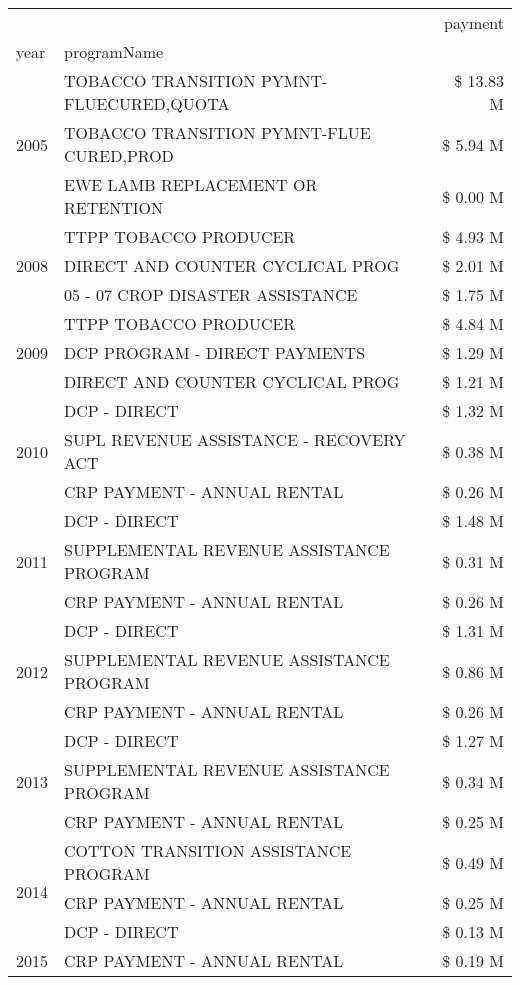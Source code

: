 \begin{tabular}{llr}
\toprule
 &  & payment \\
year & programName &  \\
\midrule
\multirow[t]{3}{*}{2005} & TOBACCO TRANSITION PYMNT-FLUECURED,QUOTA & \$ 13.83 M \\
 & TOBACCO TRANSITION PYMNT-FLUE CURED,PROD & \$ 5.94 M \\
 & EWE LAMB REPLACEMENT OR RETENTION & \$ 0.00 M \\
\cline{1-3}
\multirow[t]{3}{*}{2008} & TTPP TOBACCO PRODUCER & \$ 4.93 M \\
 & DIRECT AND COUNTER CYCLICAL PROG & \$ 2.01 M \\
 & 05 - 07 CROP DISASTER ASSISTANCE & \$ 1.75 M \\
\cline{1-3}
\multirow[t]{3}{*}{2009} & TTPP TOBACCO PRODUCER & \$ 4.84 M \\
 & DCP PROGRAM - DIRECT PAYMENTS & \$ 1.29 M \\
 & DIRECT AND COUNTER CYCLICAL PROG & \$ 1.21 M \\
\cline{1-3}
\multirow[t]{3}{*}{2010} & DCP - DIRECT & \$ 1.32 M \\
 & SUPL REVENUE ASSISTANCE - RECOVERY ACT & \$ 0.38 M \\
 & CRP PAYMENT - ANNUAL RENTAL & \$ 0.26 M \\
\cline{1-3}
\multirow[t]{3}{*}{2011} & DCP - DIRECT & \$ 1.48 M \\
 & SUPPLEMENTAL REVENUE ASSISTANCE PROGRAM & \$ 0.31 M \\
 & CRP PAYMENT - ANNUAL RENTAL & \$ 0.26 M \\
\cline{1-3}
\multirow[t]{3}{*}{2012} & DCP - DIRECT & \$ 1.31 M \\
 & SUPPLEMENTAL REVENUE ASSISTANCE PROGRAM & \$ 0.86 M \\
 & CRP PAYMENT - ANNUAL RENTAL & \$ 0.26 M \\
\cline{1-3}
\multirow[t]{3}{*}{2013} & DCP - DIRECT & \$ 1.27 M \\
 & SUPPLEMENTAL REVENUE ASSISTANCE PROGRAM & \$ 0.34 M \\
 & CRP PAYMENT - ANNUAL RENTAL & \$ 0.25 M \\
\cline{1-3}
\multirow[t]{3}{*}{2014} & COTTON TRANSITION ASSISTANCE PROGRAM & \$ 0.49 M \\
 & CRP PAYMENT - ANNUAL RENTAL & \$ 0.25 M \\
 & DCP - DIRECT & \$ 0.13 M \\
\cline{1-3}
\multirow[t]{3}{*}{2015} & CRP PAYMENT - ANNUAL RENTAL & \$ 0.19 M \\

\end{tabular}
